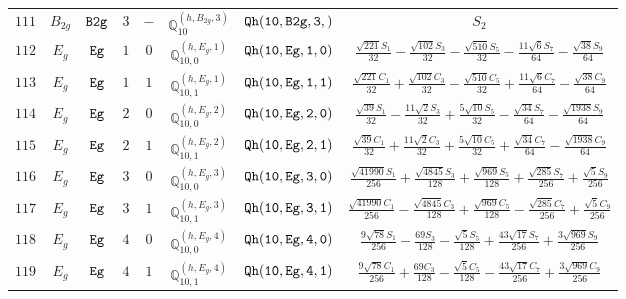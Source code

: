 \documentclass[fleqn,8pt]{jsarticle}
\begin{document}
\begin{table}[ht!]
\begin{center}
\begin{tabular}{cccccccc}
$ 111 $ & $ B_{2g} $ & $ {\tt B2g} $ & $ 3 $ & $ - $ & $ \mathbb{Q}_{10}^{(h,B_{2g},3)} $ & $ {\tt Qh(10,B2g,3,)} $ & $ S_{2} $ \\
$ 112 $ & $ E_{g} $ & $ {\tt Eg} $ & $ 1 $ & $ 0 $ & $ \mathbb{Q}_{10,0}^{(h,E_{g},1)} $ & $ {\tt Qh(10,Eg,1,0)} $ & $ \frac{\sqrt{221} S_{1}}{32} - \frac{\sqrt{102} S_{3}}{32} - \frac{\sqrt{510} S_{5}}{32} - \frac{11 \sqrt{6} S_{7}}{64} - \frac{\sqrt{38} S_{9}}{64} $ \\
$ 113 $ & $ E_{g} $ & $ {\tt Eg} $ & $ 1 $ & $ 1 $ & $ \mathbb{Q}_{10,1}^{(h,E_{g},1)} $ & $ {\tt Qh(10,Eg,1,1)} $ & $ \frac{\sqrt{221} C_{1}}{32} + \frac{\sqrt{102} C_{3}}{32} - \frac{\sqrt{510} C_{5}}{32} + \frac{11 \sqrt{6} C_{7}}{64} - \frac{\sqrt{38} C_{9}}{64} $ \\
$ 114 $ & $ E_{g} $ & $ {\tt Eg} $ & $ 2 $ & $ 0 $ & $ \mathbb{Q}_{10,0}^{(h,E_{g},2)} $ & $ {\tt Qh(10,Eg,2,0)} $ & $ \frac{\sqrt{39} S_{1}}{32} - \frac{11 \sqrt{2} S_{3}}{32} + \frac{5 \sqrt{10} S_{5}}{32} - \frac{\sqrt{34} S_{7}}{64} - \frac{\sqrt{1938} S_{9}}{64} $ \\
$ 115 $ & $ E_{g} $ & $ {\tt Eg} $ & $ 2 $ & $ 1 $ & $ \mathbb{Q}_{10,1}^{(h,E_{g},2)} $ & $ {\tt Qh(10,Eg,2,1)} $ & $ \frac{\sqrt{39} C_{1}}{32} + \frac{11 \sqrt{2} C_{3}}{32} + \frac{5 \sqrt{10} C_{5}}{32} + \frac{\sqrt{34} C_{7}}{64} - \frac{\sqrt{1938} C_{9}}{64} $ \\
$ 116 $ & $ E_{g} $ & $ {\tt Eg} $ & $ 3 $ & $ 0 $ & $ \mathbb{Q}_{10,0}^{(h,E_{g},3)} $ & $ {\tt Qh(10,Eg,3,0)} $ & $ \frac{\sqrt{41990} S_{1}}{256} + \frac{\sqrt{4845} S_{3}}{128} + \frac{\sqrt{969} S_{5}}{128} + \frac{\sqrt{285} S_{7}}{256} + \frac{\sqrt{5} S_{9}}{256} $ \\
$ 117 $ & $ E_{g} $ & $ {\tt Eg} $ & $ 3 $ & $ 1 $ & $ \mathbb{Q}_{10,1}^{(h,E_{g},3)} $ & $ {\tt Qh(10,Eg,3,1)} $ & $ \frac{\sqrt{41990} C_{1}}{256} - \frac{\sqrt{4845} C_{3}}{128} + \frac{\sqrt{969} C_{5}}{128} - \frac{\sqrt{285} C_{7}}{256} + \frac{\sqrt{5} C_{9}}{256} $ \\
$ 118 $ & $ E_{g} $ & $ {\tt Eg} $ & $ 4 $ & $ 0 $ & $ \mathbb{Q}_{10,0}^{(h,E_{g},4)} $ & $ {\tt Qh(10,Eg,4,0)} $ & $ \frac{9 \sqrt{78} S_{1}}{256} - \frac{69 S_{3}}{128} - \frac{\sqrt{5} S_{5}}{128} + \frac{43 \sqrt{17} S_{7}}{256} + \frac{3 \sqrt{969} S_{9}}{256} $ \\
$ 119 $ & $ E_{g} $ & $ {\tt Eg} $ & $ 4 $ & $ 1 $ & $ \mathbb{Q}_{10,1}^{(h,E_{g},4)} $ & $ {\tt Qh(10,Eg,4,1)} $ & $ \frac{9 \sqrt{78} C_{1}}{256} + \frac{69 C_{3}}{128} - \frac{\sqrt{5} C_{5}}{128} - \frac{43 \sqrt{17} C_{7}}{256} + \frac{3 \sqrt{969} C_{9}}{256} $ \\

\end{tabular}
\end{center}
\end{table}
\end{document}
